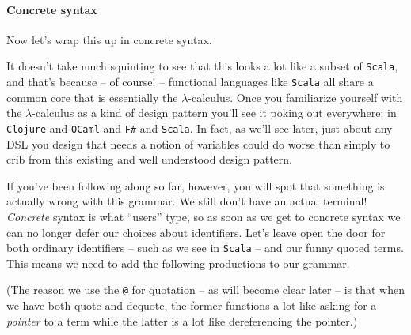 \paragraph{Concrete syntax}
Now let's wrap this up in concrete syntax.


It doesn't take much squinting to see that this looks a lot like a
subset of \texttt{Scala}, and that's because -- of course! --
functional languages like \texttt{Scala} all share a common core that
is essentially the $\lambda$-calculus. Once you familiarize yourself
with the $\lambda$-calculus as a kind of design pattern you'll see it
poking out everywhere: in \texttt{Clojure} and \texttt{OCaml} and
\texttt{F\#} and \texttt{Scala}. In fact, as we'll see later, just
about any DSL you design that needs a notion of variables could do
worse than simply to crib from this existing and well understood
design pattern.

If you've been following along so far, however, you will spot that
something is actually wrong with this grammar. We still don't have an
actual terminal! \emph{Concrete} syntax is what ``users'' type, so as
soon as we get to concrete syntax we can no longer defer our choices
about identifiers. Let's leave open the door for both ordinary
identifiers -- such as we see in \texttt{Scala} -- and our funny
quoted terms. This means we need to add the following productions to
our grammar.


(The reason we use the \texttt{@} for quotation -- as will become
clear later -- is that when we have both quote and dequote, the former
functions a lot like asking for a \emph{pointer} to a term while the
latter is a lot like dereferencing the pointer.)

